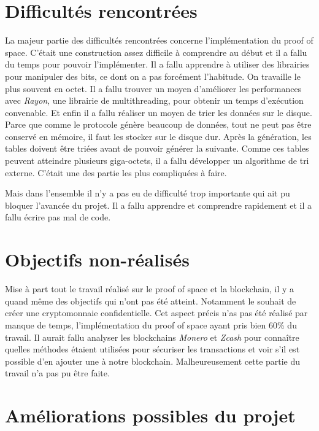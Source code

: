 \section{Difficultés rencontrées}

La majeur partie des difficultés rencontrées concerne l'implémentation du proof of space. C'était une construction assez difficile à comprendre au début et il a fallu du temps pour pouvoir l'implémenter. Il a fallu apprendre à utiliser des librairies pour manipuler des bits, ce dont on a pas forcément l'habitude. On travaille le plus souvent en octet. Il a fallu trouver un moyen d'améliorer les performances avec \emph{Rayon}, une librairie de multithreading, pour obtenir un temps d'exécution convenable. Et enfin il a fallu réaliser un moyen de trier les données sur le disque. Parce que comme le protocole génère beaucoup de données, tout ne peut pas être conservé en mémoire, il faut les stocker sur le disque dur. Après la génération, les tables doivent être triées avant de pouvoir générer la suivante. Comme ces tables peuvent atteindre plusieurs giga-octets, il a fallu développer un algorithme de tri externe. C'était une des partie les plus compliquées à faire.

Mais dans l'ensemble il n'y a pas eu de difficulté trop importante qui ait pu bloquer l'avancée du projet. Il a fallu apprendre et comprendre rapidement et il a fallu écrire pas mal de code.


\section{Objectifs non-réalisés}

Mise à part tout le travail réalisé sur le proof of space et la blockchain, il y a quand même des objectifs qui n'ont pas été atteint. Notamment le souhait de créer une cryptomonnaie confidentielle. Cet aspect précis n'as pas été réalisé par manque de temps, l'implémentation du proof of space ayant pris bien 60\% du travail. Il aurait fallu analyser les blockchains \emph{Monero} et \emph{Zcash} pour connaître quelles méthodes étaient utilisées pour sécuriser les transactions et voir s'il est possible d'en ajouter une à notre blockchain. Malheureusement cette partie du travail n'a pas pu être faite.

\section{Améliorations possibles du projet}

